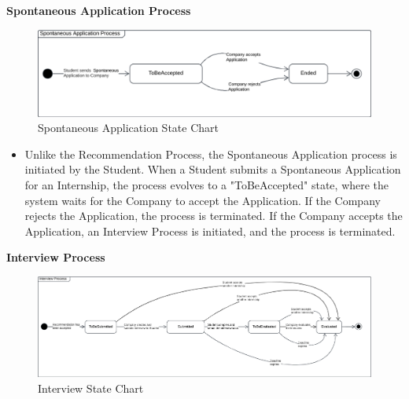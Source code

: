 \noindent\textbf{\color{titleColor}Spontaneous Application Process}\\
\begin{figure}[ht]
    \centering
    \includegraphics[width=1 \textwidth]{Latex/Images/SpontaneousApplicationStateChart.png}
    \caption{Spontaneous Application State Chart}
    \label{fig:SpontaneousApplication}
\end{figure}
\begin{itemize}
    \item Unlike the Recommendation Process, the Spontaneous Application process is initiated by the Student. When a Student submits a Spontaneous Application for an Internship, the process evolves to a "ToBeAccepted" state, where the system waits for the Company to accept the Application. If the Company rejects the Application, the process is terminated. If the Company accepts the Application, an Interview Process is initiated, and the process is terminated.
\end{itemize} 
\clearpage
\noindent\textbf{\color{titleColor}Interview Process}\\
\begin{figure}[H]
    \centering
    \includegraphics[width=1 \textwidth]{Latex/Images/InterviewProcessStateChart.png}
    \caption{Interview State Chart}
    \label{fig:InterviewProcess}
\end{figure}

